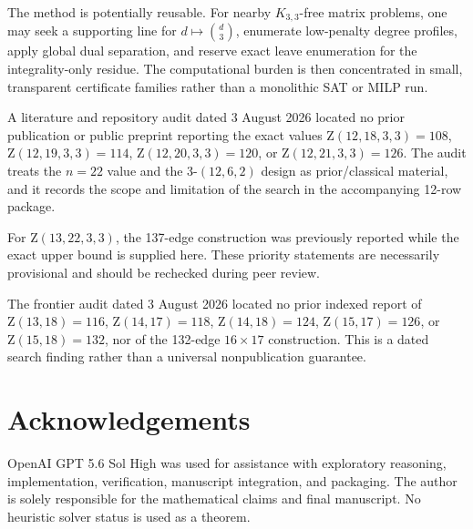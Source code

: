 \documentclass[11pt]{amsart}
\newcommand{\Z}{\mathrm Z}
\begin{document}
The method is potentially reusable. For nearby $K_{3,3}$-free matrix problems, one may seek a supporting line for $d\mapsto\binom d3$, enumerate low-penalty degree profiles, apply global dual separation, and reserve exact leave enumeration for the integrality-only residue. The computational burden is then concentrated in small, transparent certificate families rather than a monolithic SAT or MILP run.

\sloppy
A literature and repository audit dated 3 August 2026 located no prior
publication or public preprint reporting the exact values
$\Z(12,18,3,3)=108$, $\Z(12,19,3,3)=114$, $\Z(12,20,3,3)=120$, or
$\Z(12,21,3,3)=126$. The audit treats the $n=22$ value and the
3-$(12,6,2)$ design as prior/classical material, and it records the scope and
limitation of the search in the accompanying 12-row package.

For $\Z(13,22,3,3)$, the 137-edge construction was previously reported while
the exact upper bound is supplied here. These priority statements are
necessarily provisional and should be rechecked during peer review.

The frontier audit dated 3 August 2026 located no prior indexed report of
$\Z(13,18)=116$, $\Z(14,17)=118$, $\Z(14,18)=124$, $\Z(15,17)=126$, or
$\Z(15,18)=132$, nor of the 132-edge $16\times17$ construction. This is a
dated search finding rather than a universal nonpublication guarantee.
\fussy

\section*{Acknowledgements}
OpenAI GPT 5.6 Sol High was used for assistance with exploratory reasoning,
implementation, verification, manuscript integration, and packaging. The
author is solely responsible for the mathematical claims and final manuscript.
No heuristic solver status is used as a theorem.

\appendix
\end{document}
